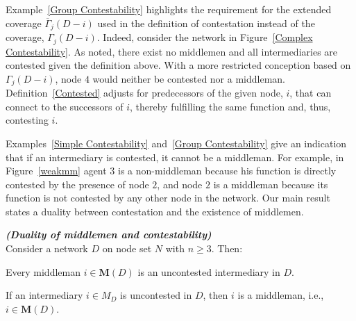 \noindent
Example~\ref{Group Contestability} highlights the requirement for the extended coverage $\overline{\Gamma}_{j}(D - i)$ used in the definition of contestation instead of the coverage, $\Gamma_{j}(D - i)$. Indeed, consider the network in Figure~\ref{Complex Contestability}. As noted, there exist no middlemen and all intermediaries are contested given the definition above. With a more restricted conception based on $\Gamma_{j}(D - i)$, node $4$ would neither be contested nor a middleman. Definition~\ref{Contested} adjusts for predecessors of the given node, $i$, that can connect to the successors of $i$, thereby fulfilling the same function and, thus, contesting $i$.

Examples~\ref{Simple Contestability} and~\ref{Group Contestability} give an indication that if an intermediary is contested, it cannot be a middleman. For example, in Figure~\ref{weakmm} agent $3$ is a non-middleman because his function is directly contested by the presence of node $2$, and node $2$ is a middleman because its function is not contested by any other node in the network. Our main result states a duality between contestation and the existence of middlemen.
\begin{theorem} \label{duality} \textbf{\emph{(Duality of middlemen and contestability)}} \\
Consider a network $D$ on node set $N$ with $n \geqslant 3$. Then:
\begin{abet}
	\item Every middleman $i \in \mathbf M (D)$ is an uncontested intermediary in $D$.
	\item If an intermediary $i \in M_D$ is uncontested in $D$, then $i$ is a middleman, i.e., $i \in \mathbf M (D)$.
\end{abet}
\end{theorem}
